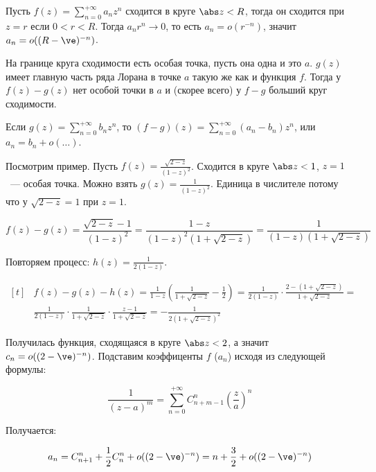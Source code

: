 \begin{example}

    Пусть $f(z) = \sum\limits_{n=0}^{+\infty} a_nz^n$ сходится
    в круге $\abs z < R$, тогда он сходится при
    $z = r$ если $0 < r < R$. Тогда $a_nr^n \to 0$,
    то есть $a_n = o(r^{-n})$,
    значит $a_n = o((R-\ve)^{-n})$.

    На границе круга сходимости есть особая точка,
    пусть она одна и это $a$.
    $g(z)$ имеет главную часть ряда Лорана
    в точке $a$ такую же как и функция $f$.
    Тогда у $f(z)-g(z)$ нет особой точки в $a$
    и (скорее всего) у $f-g$ больший круг сходимости.

    Если $g(z) = \sum\limits_{n=0}^{+\infty}
        b_nz^n$, то $(f-g)(z) = \sum\limits_{n=0}^{+\infty} (a_n-b_n) z^n$,
    или $a_n = b_n + o (\ldots)$.

    Посмотрим пример. Пусть $f(z) = \frac{\sqrt{2-z}}{(1-z)^2}$.
    Сходится в круге $\abs z < 1$, $z = 1$~--- особая точка.
    Можно взять $g(z) = \frac{1}{(1-z)^2}$.
    Единица в числителе потому что у $\sqrt{2-z} = 1$ при $z = 1$.

    \[
        f(z) - g(z) = \frac{\sqrt{2-z}-1}{(1-z)^2}
        = \frac{1-z}{(1-z)^2(1+\sqrt{2-z})}
        = \frac{1}{(1-z)(1+\sqrt{2-z})}
    \]

    Повторяем процесс: $h(z) = \frac{1}{2(1-z)}$.

    \[
        \begin{aligned}[t]
             & f(z) - g(z) - h(z) = \frac{1}{1-z}
            \left(\frac{1}{1+\sqrt{2-z}} - \frac{1}{2}\right)
            = \frac{1}{2(1-z)} \cdot \frac{2-(1+\sqrt{2-z})}{1+\sqrt{2-z}}
            =                                                \\
             & \frac{1}{2(1-z)} \cdot \frac{1}{1+\sqrt{2-z}}
            \cdot \frac{z-1}{1+\sqrt{2-z}}
            = -\frac{1}{2(1+\sqrt{2-z})^2}
        \end{aligned}
    \]

    Получилась функция, сходящаяся в круге $\abs z < 2$,
    а значит $c_n = o((2-\ve)^{-n})$. Подставим коэффиценты
    $f$ ($a_n$) исходя из следующей формулы:

    \[
        \frac{1}{(z-a)^m} = \sum\limits_{n=0}^{+\infty}
        C_{n+m-1}^{n}
        \left(\frac{z}{a} \right)^n
    \]

    Получается:

    \[
        a_n = C_{n+1}^n + \frac{1}{2}C_n^n + o((2-\ve)^{-n})
        = n + \frac{3}{2} + o((2-\ve)^{-n})
    \]
\end{example}
